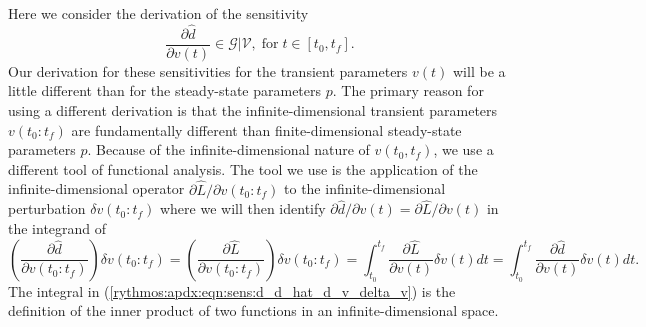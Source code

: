 \documentclass[pdf,ps2pdf,11pt]{SANDreport}
\begin{document}
Here we consider the derivation of the sensitivity
%
\begin{equation}
\frac{\partial \hat{d}}{\partial v(t)} \in \mathcal{G}|\mathcal{V}, \; \mbox{for} \; t\in[t_0,t_f].
\end{equation}
%
Our derivation for these sensitivities for the transient parameters
$v(t)$ will be a little different than for the steady-state parameters
$p$.  The primary reason for using a different derivation is that the
infinite-dimensional transient parameters $v(t_0:t_f)$ are
fundamentally different than finite-dimensional steady-state parameters
$p$.  Because of the infinite-dimensional nature of $v(t_0,t_f)$, we
use a different tool of functional analysis.  The tool we use is the
application of the infinite-dimensional operator $\partial \hat{L} /
{}\partial v(t_0:t_f)$ to the infinite-dimensional perturbation
$\delta v(t_0:t_f)$ where we will then identify $\partial {}\hat{d} /
{}\partial v(t) = {}\partial {}\hat{L} / {}\partial v(t)$ in the
integrand of
%
\begin{equation}
\left( \frac{\partial \hat{d}}{\partial v(t_0:t_f)} \right) \delta v(t_0:t_f)
= \left( \frac{\partial \hat{L}}{\partial v(t_0:t_f)} \right) \delta v(t_0:t_f)
= \int_{t_0}^{t_f} \frac{\partial \hat{L}}{\partial v(t)} \delta v(t) dt
= \int_{t_0}^{t_f} \frac{\partial \hat{d}}{\partial v(t)} \delta v(t) dt.
\label{rythmos:apdx:eqn:sens:d_d_hat_d_v_delta_v}
\end{equation}
%
The integral in (\ref{rythmos:apdx:eqn:sens:d_d_hat_d_v_delta_v}) is the
definition of the inner product of two functions in an
infinite-dimensional space.
   
\end{document}
